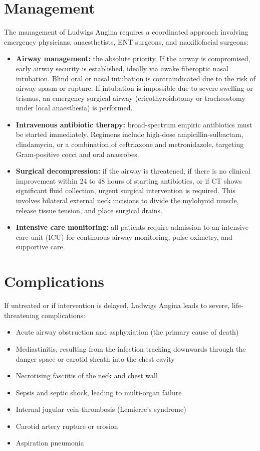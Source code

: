 \section*{Management}
The management of Ludwigs Angina requires a coordinated approach involving emergency physicians, anaesthetists, ENT surgeons, and maxillofacial surgeons:
\begin{itemize}
    \item \textbf{Airway management:} the absolute priority. If the airway is compromised, early airway security is established, ideally via awake fiberoptic nasal intubation. Blind oral or nasal intubation is contraindicated due to the risk of airway spasm or rupture. If intubation is impossible due to severe swelling or trismus, an emergency surgical airway (cricothyroidotomy or tracheostomy under local anaesthesia) is performed.
    \item \textbf{Intravenous antibiotic therapy:} broad-spectrum empiric antibiotics must be started immediately. Regimens include high-dose ampicillin-sulbactam, clindamycin, or a combination of ceftriaxone and metronidazole, targeting Gram-positive cocci and oral anaerobes.
    \item \textbf{Surgical decompression:} if the airway is threatened, if there is no clinical improvement within 24 to 48 hours of starting antibiotics, or if CT shows significant fluid collection, urgent surgical intervention is required. This involves bilateral external neck incisions to divide the mylohyoid muscle, release tissue tension, and place surgical drains.
    \item \textbf{Intensive care monitoring:} all patients require admission to an intensive care unit (ICU) for continuous airway monitoring, pulse oximetry, and supportive care.
\end{itemize}

\section*{Complications}
If untreated or if intervention is delayed, Ludwigs Angina leads to severe, life-threatening complications:
\begin{itemize}
    \item Acute airway obstruction and asphyxiation (the primary cause of death)
    \item Mediastinitis, resulting from the infection tracking downwards through the danger space or carotid sheath into the chest cavity
    \item Necrotising fasciitis of the neck and chest wall
    \item Sepsis and septic shock, leading to multi-organ failure
    \item Internal jugular vein thrombosis (Lemierre's syndrome)
    \item Carotid artery rupture or erosion
    \item Aspiration pneumonia
\end{itemize}

